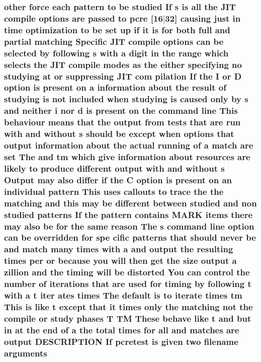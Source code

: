 \subsubsection[{\texorpdfstring{arguments}{arguments}}]{ other force each {\bf pattern} {\bf to} {\bf be} {\bf studied} If {\bf s} {\bf is} {\bf all} the J\+IT {\bf compile} {\bf options} {\bf are} passed {\bf to} {\bf pcre} \mbox{[}16$\vert$32\mbox{]} causing just {\bf in} {\bf time} optimization {\bf to} {\bf be} {\bf set} up {\bf if} {\bf it} {\bf is} for both full and {\bf partial} {\bf matching} Specific J\+IT {\bf compile} {\bf options} {\bf can} {\bf be} {\bf selected} by following {\bf s} {\bf with} {\bf a} digit {\bf in} the range {\bf which} selects the J\+IT {\bf compile} {\bf modes} {\bf as} the either {\bf specifying} no {\bf studying} at {\bf or} suppressing J\+IT com pilation If the {\bf I} {\bf or} {\bf D} {\bf option} {\bf is} {\bf present} {\bf on} {\bf a} information about the {\bf result} {\bf of} {\bf studying} {\bf is} {\bf not} {\bf included} when {\bf studying} {\bf is} caused only by {\bf s} and neither {\bf i} nor {\bf d} {\bf is} {\bf present} {\bf on} the {\bf command} {\bf line} This behaviour means that the {\bf output} {\bf from} {\bf tests} that {\bf are} {\bf run} {\bf with} and without {\bf s} should {\bf be} {\bf except} when {\bf options} that {\bf output} information about the actual running {\bf of} {\bf a} {\bf match} {\bf are} {\bf set} The and {\bf tm} {\bf which} give information about resources {\bf are} likely {\bf to} produce different {\bf output} {\bf with} and without {\bf s} Output may also differ {\bf if} the {\bf C} {\bf option} {\bf is} {\bf present} {\bf on} an individual {\bf pattern} This uses callouts {\bf to} trace the the {\bf matching} and {\bf this} may {\bf be} different between {\bf studied} and non {\bf studied} {\bf patterns} If the {\bf pattern} {\bf contains} M\+A\+RK items there may also {\bf be} for the same {\bf reason} The {\bf s} {\bf command} {\bf line} {\bf option} {\bf can} {\bf be} overridden for spe cific {\bf patterns} that should never {\bf be} and {\bf match} many {\bf times} {\bf with} {\bf a} and {\bf output} the resulting {\bf times} per {\bf or} because you will then get the {\bf size} {\bf output} {\bf a} zillion and the timing will {\bf be} distorted You {\bf can} control the {\bf number} {\bf of} iterations that {\bf are} {\bf used} for timing by following {\bf t} {\bf with} {\bf a} {\bf t} {\bf iter} ates {\bf times} The {\bf default} {\bf is} {\bf to} iterate {\bf times} {\bf tm} This {\bf is} like {\bf t} {\bf except} that {\bf it} {\bf times} only the {\bf matching} {\bf not} the {\bf compile} {\bf or} {\bf study} phases {\bf T} TM These behave like {\bf t} and but {\bf in} at the {\bf end} {\bf of} {\bf a} the total {\bf times} for {\bf all} and {\bf matches} {\bf are} {\bf output} D\+E\+S\+C\+R\+I\+P\+T\+I\+ON If {\bf pcretest} {\bf is} {\bf given} two {\bf filename} arguments}\hypertarget{pcretest_8txt_a10a3a3b838670cc298974841b7588803}{}\label{pcretest_8txt_a10a3a3b838670cc298974841b7588803}
